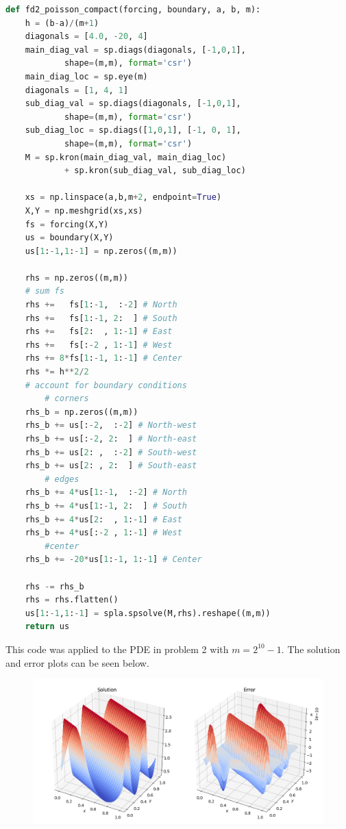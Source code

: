 \documentclass[12pt]{article}
\begin{document}
\begin{lstlisting}[language=python]
def fd2_poisson_compact(forcing, boundary, a, b, m):
	h = (b-a)/(m+1)
	diagonals = [4.0, -20, 4]
	main_diag_val = sp.diags(diagonals, [-1,0,1], 
			shape=(m,m), format='csr')
	main_diag_loc = sp.eye(m)
	diagonals = [1, 4, 1]
	sub_diag_val = sp.diags(diagonals, [-1,0,1], 
			shape=(m,m), format='csr')
	sub_diag_loc = sp.diags([1,0,1], [-1, 0, 1], 
			shape=(m,m), format='csr')
	M = sp.kron(main_diag_val, main_diag_loc) 
			+ sp.kron(sub_diag_val, sub_diag_loc)
	
	xs = np.linspace(a,b,m+2, endpoint=True)
	X,Y = np.meshgrid(xs,xs)
	fs = forcing(X,Y)
	us = boundary(X,Y)
	us[1:-1,1:-1] = np.zeros((m,m))
	
	rhs = np.zeros((m,m))
	# sum fs
	rhs +=   fs[1:-1,  :-2] # North
	rhs +=   fs[1:-1, 2:  ] # South
	rhs +=   fs[2:  , 1:-1] # East
	rhs +=   fs[:-2 , 1:-1] # West
	rhs += 8*fs[1:-1, 1:-1] # Center
	rhs *= h**2/2
	# account for boundary conditions
		# corners
	rhs_b = np.zeros((m,m))
	rhs_b += us[:-2,  :-2] # North-west
	rhs_b += us[:-2, 2:  ] # North-east
	rhs_b += us[2: ,  :-2] # South-west
	rhs_b += us[2: , 2:  ] # South-east
		# edges
	rhs_b += 4*us[1:-1,  :-2] # North
	rhs_b += 4*us[1:-1, 2:  ] # South
	rhs_b += 4*us[2:  , 1:-1] # East
	rhs_b += 4*us[:-2 , 1:-1] # West
		#center
	rhs_b += -20*us[1:-1, 1:-1] # Center
	
	rhs -= rhs_b
	rhs = rhs.flatten()
	us[1:-1,1:-1] = spla.spsolve(M,rhs).reshape((m,m))
	return us
\end{lstlisting}

This code was applied to the PDE in problem 2 with $m=2^{10}-1$. The solution and error plots can be seen below.

\begin{figure}[H]
	\centering
	\includegraphics[width=1\linewidth]{hw4_p4}
\end{figure}
\end{document}
